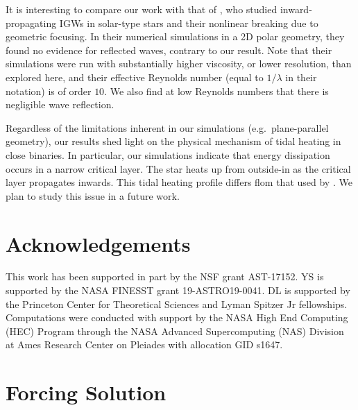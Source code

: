 \documentclass[
        fleqn,
        usenatbib,
    ]{mnras}
\begin{document}
It is interesting to compare our work with that of \citet{barker_ogilvie}, who
studied inward-propagating IGWs in solar-type stars and their nonlinear breaking
due to geometric focusing. In their numerical simulations in a 2D polar
geometry, they found no evidence for reflected waves, contrary to our result.
Note that their simulations were run with substantially higher viscosity, or
lower resolution, than explored here, and their effective Reynolds number (equal
to $1/\lambda$ in their notation) is of order $10$. We also find at low Reynolds
numbers that there is negligible wave reflection.

Regardless of the limitations inherent in our simulations (e.g.\ plane-parallel
geometry), our results shed light on the physical mechanism of tidal heating in
close binaries. In particular, our simulations indicate that energy dissipation
occurs in a narrow critical layer. The star heats up from outside-in as the
critical layer propagates inwards. This tidal heating profile differs flom that
used by \citet{tidal_novae}. We plan to study this issue in a future work.

\section{Acknowledgements}\label{s:ack}

This work has been supported in part by the NSF grant AST-17152. YS is supported
by the NASA FINESST grant 19-ASTRO19-0041.%
DL is supported by the Princeton Center for Theoretical Sciences and Lyman
Spitzer Jr fellowships. Computations were conducted with support by the NASA
High End Computing (HEC) Program through the NASA Advanced Supercomputing (NAS)
Division at Ames Research Center on Pleiades with allocation GID s1647.




\clearpage
\onecolumn
\appendix

\section{Forcing Solution}\label{s:force_solved}
\end{document}
